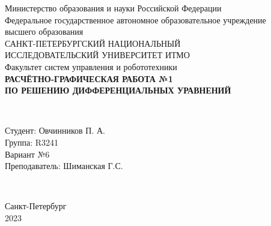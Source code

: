 \documentclass[a3paper,14pt]{article}
\begin{document}
\begin{titlepage}
    \begin{center}
        Министерство образования и науки Российской Федерации \\
        Федеральное государственное автономное образовательное учреждение \\ высшего образования \\[6pt]
        САНКТ-ПЕТЕРБУРГСКИЙ НАЦИОНАЛЬНЫЙ \\ ИССЛЕДОВАТЕЛЬСКИЙ УНИВЕРСИТЕТ ИТМО \\[16pt]
        Факультет систем управления и робототехники \\[25em]
        \textbf{РАСЧЁТНО-ГРАФИЧЕСКАЯ РАБОТА №1\\ПО РЕШЕНИЮ ДИФФЕРЕНЦИАЛЬНЫХ УРАВНЕНИЙ}
    \end{center}\,\\[12em]
    \begin{flushright}
        Студент: Овчинников П. А.\\
        Группа: R3241 \\
        Вариант №6 \\
        Преподаватель: Шиманская Г.С.
    \end{flushright}\,\\[13em]
    \begin{center}
        {\small Санкт-Петербург \\ 2023}
    \end{center}    
\end{titlepage}
\end{document}

